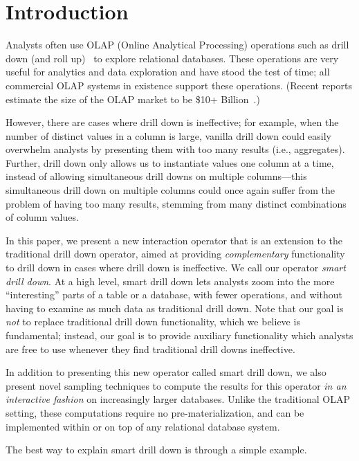 

\section{Introduction}
Analysts often use OLAP (Online Analytical Processing) operations
such as drill down (and roll up)~\cite{export:69578} to explore
relational databases. 
These operations are very useful for analytics and data exploration and have stood the test of time;
all commercial OLAP systems 
in existence support these operations. (Recent reports estimate the size of the OLAP market to be \$10+ Billion~\cite{gartner}.)


However, there are cases where drill down is ineffective; 
for example, when the number of distinct values
in a column is large, vanilla drill down 
could easily overwhelm analysts by presenting them with too many 
results (i.e., aggregates). 
Further, drill down only allows us to instantiate values
 one column at a time, instead of allowing simultaneous drill downs
on multiple columns---this simultaneous drill down on multiple columns 
could once again suffer from the problem
of having too many results, stemming from many distinct combinations of column values.

In this paper, we present a new interaction operator 
that is an extension to the traditional 
drill down operator, aimed at providing {\em complementary}
functionality to drill down in cases where drill down is
ineffective. We call our operator {\em smart drill down}.
At a high level, smart drill down lets analysts zoom into
the more ``interesting'' parts of a table or a database,
with fewer operations, and without having to examine as much
data as traditional drill down.
Note that our goal is {\em not} to replace traditional 
drill down functionality, which we believe is fundamental;
instead, our goal is to provide auxiliary functionality 
which analysts are free to use whenever they find 
traditional drill downs ineffective.

In addition to presenting this new operator called smart drill down, we also present novel sampling techniques to compute the results for this
operator {\em in an interactive fashion} on increasingly larger databases. 
Unlike the traditional OLAP setting, these computations 
require no pre-materialization, and can be implemented 
within or on top of any relational database system.



The best way to explain smart drill down is through a simple example.


